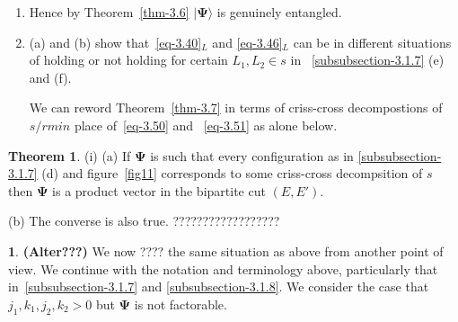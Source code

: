 \documentclass[a4paper,12pt]{article}
\theoremstyle{definition}
\theoremstyle{underlinethm}
\newtheorem{thm}{Theorem}[section]
\theoremstyle{definition}
\newtheorem{subsubsec}{}[subsection]
\begin{document}
\begin{enumerate}[label=(\alph*)]
\item Hence by Theorem~\ref{thm-3.6} $| \boldsymbol{\Psi} \rangle$ is genuinely entangled.

\item (a) and (b) show that~\eqref{eq-3.40}$_{L}$ and \eqref{eq-3.46}$_{L}$ can be in different situations of holding or not holding for certain $L_{1}, L_{2} \in s$ in ~\eqref{subsubsection-3.1.7} (e) and (f).

We can reword Theorem~\ref{thm-3.7} in terms of criss-cross decompostions of $s/ {rm in}$ place of~\eqref{eq-3.50} and ~\eqref{eq-3.51} as alone below.

\end{enumerate}

\begin{thm}\label{thm-3.8}
(i) (a) If $\boldsymbol{\Psi}$ is such that every configuration as in \ref{subsubsection-3.1.7} (d) and figure~\ref{fig11} corresponds to some criss-cross decompsition of $s$ then $\boldsymbol{\Psi}$ is a product vector in the bipartite cut $(E, E')$.

(b) The converse is also true. ??????????????????
\end{thm}

\begin{subsubsec}\label{subsubsection-3.1.9}
{\bfseries(Alter???)} We now ???? the same situation as above from another point of view. We continue with the notation and terminology above, particularly that in~\eqref{subsubsection-3.1.7} and \eqref{subsubsection-3.1.8}. We consider the case that $j_{1}, k_{1}, j_{2}, k_{2} > 0$ but $\boldsymbol{\Psi}$ is not factorable. 
\end{subsubsec}
\end{document}
